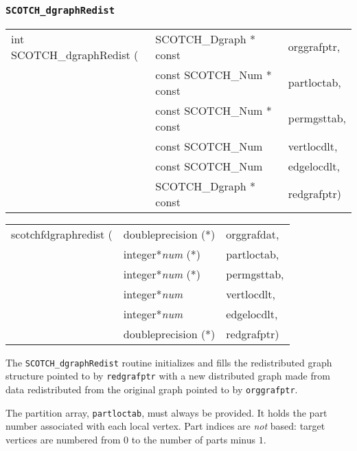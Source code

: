 \subsubsection{{\tt SCOTCH\_dgraphRedist}}
\label{sec-lib-dgraphredist}

\begin{itemize}
\progsyn

{\tt\begin{tabular}{l@{}ll}

int SCOTCH\_dgraphRedist ( & SCOTCH\_Dgraph * const    & orggrafptr, \\
                           & const SCOTCH\_Num * const & partloctab, \\
                           & const SCOTCH\_Num * const & permgsttab, \\
                           & const SCOTCH\_Num         & vertlocdlt, \\
                           & const SCOTCH\_Num         & edgelocdlt, \\
                           & SCOTCH\_Dgraph * const    & redgrafptr)
\end{tabular}}

{\tt\begin{tabular}{l@{}ll}
scotchfdgraphredist ( & doubleprecision (*)   & orggrafdat, \\
                      & integer*{\it num} (*) & partloctab, \\
                      & integer*{\it num} (*) & permgsttab, \\
                      & integer*{\it num}     & vertlocdlt, \\
                      & integer*{\it num}     & edgelocdlt, \\
                      & doubleprecision (*)   & redgrafptr)
\end{tabular}}

\progdes

The {\tt SCOTCH\_dgraphRedist} routine initializes and fills the
redistributed graph structure pointed to by
{\tt red\lbt graf\lbt ptr} with a new distributed graph
made from data redistributed from the original
graph pointed to by {\tt org\lbt graf\lbt ptr}.

The partition array, {\tt part\lbt loc\lbt tab}, must always be
provided. It holds the part number associated with each local
vertex. Part indices are {\em not\/} based: target vertices are
numbered from $0$ to the number of parts minus $1$.


\end{itemize}
